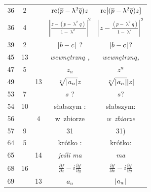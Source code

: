 \documentclass[a4paper,11pt]{article}
\numberwithin{equation}{section}
\renewcommand{\lambda}{\uplambda}
\begin{document}
\begin{center}
\begin{tabular}{|c|c|c|c|c|}
    36 & \hphantom{0}2 & & $\re( \overline{ p } - \lambda^{ 2 } \overline{ q } ) z$
    & $\re[ ( \overline{ p } - \lambda^{ 2 } \overline{ q } ) z ]$ \\
    36 & \hphantom{0}4 & & $\left| \frac{ z - ( p - \lambda^{ 2 } q) }
                 { 1 - \lambda^{ 2 } } \right|^{ 2 }$
           & $\left| z - \frac{ ( p - \lambda^{ 2 } q) }
             { 1 - \lambda^{ 2 } } \right|^{ 2 }$ \\
    39 & \hphantom{0}2 & & $| \hspace{0.05em}  b - c  \hspace{0.05em} |$ ? & $| \hspace{0.05em}  b - c  \hspace{0.05em} |$? \\
    45 & 13 & & \textit{wewnętrzną ,} & \textit{wewnętrzną,} \\
    47 & \hphantom{0}5 & & $z_{ n }$ & $z^{ n }$ \\
    49 & & 13 & $\sqrt[n]{ | \hspace{0.05em}  a_{ n }  \hspace{0.05em} | } z$
           & $\sqrt[n]{ | \hspace{0.05em}  a_{ n }  \hspace{0.05em} | } | z |$ \\
    53 & \hphantom{0}7 & & $s$ ? & $s$? \\
    54 & 10 & & słabszym : & słabszym: \\
    56 & & \hphantom{0}4 & w~zbiorze & \textit{w~zbiorze} \\
    57 & \hphantom{0}9 & & 31 & 31) \\
    64 & \hphantom{0}5 & & krótko : & krótko: \\
    65 & & 14 & \textit{jeśli ma} & \textit{ma} \\
    68 & 16 & & $\frac{ \partial f }{ \partial z } - i \frac{ \partial f }{ \partial y }$
          & $\frac{ \partial f }{ \partial x } - i \frac{ \partial f }{ \partial y }$ \\
    69 & & 13 & $a_{ n }$ & $| \hspace{0.05em}  a_{ n }  \hspace{0.05em} |$ \\
    \hline
  \end{tabular}





  \newpage


\end{center}
\end{document}
